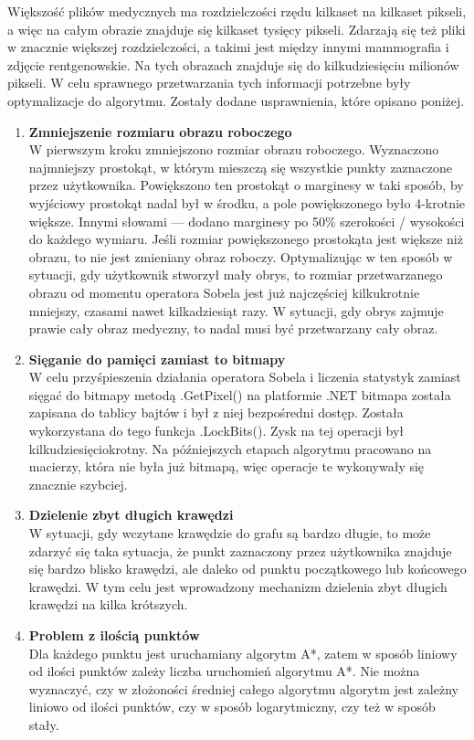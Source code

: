 \documentclass[a4paper,11pt,twoside,openright]{report}
\theoremstyle{definition}
\begin{document}
Większość plików medycznych ma rozdzielczości rzędu kilkaset na kilkaset pikseli, a więc na całym obrazie znajduje się kilkaset tysięcy pikseli. Zdarzają się też pliki w znacznie większej rozdzielczości, a takimi jest między innymi mammografia i zdjęcie rentgenowskie. Na tych obrazach znajduje się do kilkudziesięciu milionów pikseli. W celu sprawnego przetwarzania tych informacji potrzebne były optymalizacje do algorytmu. Zostały dodane usprawnienia, które opisano poniżej.
\begin{enumerate}
\item \textbf {Zmniejszenie rozmiaru obrazu roboczego} \\
W pierwszym kroku zmniejszono rozmiar obrazu roboczego. Wyznaczono najmniejszy prostokąt, w którym mieszczą się wszystkie punkty zaznaczone przez użytkownika. Powiększono ten prostokąt o marginesy w taki sposób, by wyjściowy prostokąt nadal był w środku, a pole powiększonego było 4-krotnie większe. Innymi słowami --- dodano marginesy po 50\% szerokości / wysokości do każdego wymiaru. Jeśli rozmiar powiększonego prostokąta jest większe niż obrazu, to nie jest zmieniany obraz roboczy.
Optymalizując w ten sposób w sytuacji, gdy użytkownik stworzył mały obrys, to rozmiar przetwarzanego obrazu od momentu operatora Sobela jest już najczęściej kilkukrotnie mniejszy, czasami nawet kilkadziesiąt razy. W sytuacji, gdy obrys zajmuje prawie cały obraz medyczny, to nadal musi być przetwarzany cały obraz.
\item \textbf {Sięganie do pamięci zamiast to bitmapy} \\
W celu przyśpieszenia działania operatora Sobela i liczenia statystyk zamiast sięgać do bitmapy metodą .GetPixel() na platformie .NET bitmapa została zapisana do tablicy bajtów i był z niej bezpośredni dostęp. Została wykorzystana do tego funkcja .LockBits(). Zysk na tej operacji był kilkudziesięciokrotny. Na późniejszych etapach algorytmu pracowano na macierzy, która nie była już bitmapą, więc operacje te wykonywały się znacznie szybciej.
\item \textbf {Dzielenie zbyt długich krawędzi} \\
W sytuacji, gdy wczytane krawędzie do grafu są bardzo długie, to może zdarzyć się taka sytuacja, że punkt zaznaczony przez użytkownika znajduje się bardzo blisko krawędzi, ale daleko od punktu początkowego lub końcowego krawędzi. W tym celu jest wprowadzony mechanizm dzielenia zbyt długich krawędzi na kilka krótszych.
\item \textbf {Problem z ilością punktów} \\
Dla każdego punktu jest uruchamiany algorytm A*, zatem w sposób liniowy od ilości punktów zależy liczba uruchomień algorytmu A*. Nie można wyznaczyć, czy w złożoności średniej całego algorytmu algorytm jest zależny liniowo od ilości punktów, czy w sposób logarytmiczny, czy też w sposób stały.
\end{enumerate}
\end{document}
